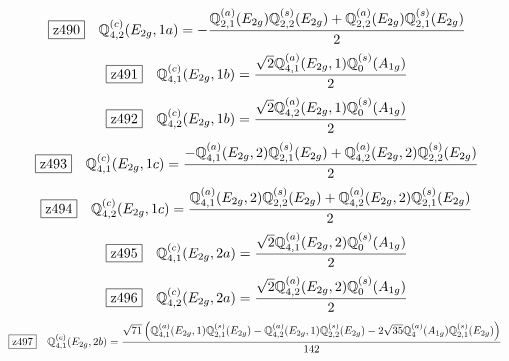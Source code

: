 \documentclass[fleqn,10pt,landscape]{jsarticle}
\begin{document}
\begin{dmath*}
\hspace*{3mm}\fbox{z490}\quad \mathbb{Q}_{4,2}^{(c)}(E_{2g},1a)=- \frac{\mathbb{Q}_{2,1}^{(a)}(E_{2g}) \mathbb{Q}_{2,2}^{(s)}(E_{2g}) + \mathbb{Q}_{2,2}^{(a)}(E_{2g}) \mathbb{Q}_{2,1}^{(s)}(E_{2g})}{2}
\end{dmath*}
\begin{dmath*}
\hspace*{3mm}\fbox{z491}\quad \mathbb{Q}_{4,1}^{(c)}(E_{2g},1b)=\frac{\sqrt{2} \mathbb{Q}_{4,1}^{(a)}(E_{2g},1) \mathbb{Q}_{0}^{(s)}(A_{1g})}{2}
\end{dmath*}
\begin{dmath*}
\hspace*{3mm}\fbox{z492}\quad \mathbb{Q}_{4,2}^{(c)}(E_{2g},1b)=\frac{\sqrt{2} \mathbb{Q}_{4,2}^{(a)}(E_{2g},1) \mathbb{Q}_{0}^{(s)}(A_{1g})}{2}
\end{dmath*}
\begin{dmath*}
\hspace*{3mm}\fbox{z493}\quad \mathbb{Q}_{4,1}^{(c)}(E_{2g},1c)=\frac{- \mathbb{Q}_{4,1}^{(a)}(E_{2g},2) \mathbb{Q}_{2,1}^{(s)}(E_{2g}) + \mathbb{Q}_{4,2}^{(a)}(E_{2g},2) \mathbb{Q}_{2,2}^{(s)}(E_{2g})}{2}
\end{dmath*}
\begin{dmath*}
\hspace*{3mm}\fbox{z494}\quad \mathbb{Q}_{4,2}^{(c)}(E_{2g},1c)=\frac{\mathbb{Q}_{4,1}^{(a)}(E_{2g},2) \mathbb{Q}_{2,2}^{(s)}(E_{2g}) + \mathbb{Q}_{4,2}^{(a)}(E_{2g},2) \mathbb{Q}_{2,1}^{(s)}(E_{2g})}{2}
\end{dmath*}
\begin{dmath*}
\hspace*{3mm}\fbox{z495}\quad \mathbb{Q}_{4,1}^{(c)}(E_{2g},2a)=\frac{\sqrt{2} \mathbb{Q}_{4,1}^{(a)}(E_{2g},2) \mathbb{Q}_{0}^{(s)}(A_{1g})}{2}
\end{dmath*}
\begin{dmath*}
\hspace*{3mm}\fbox{z496}\quad \mathbb{Q}_{4,2}^{(c)}(E_{2g},2a)=\frac{\sqrt{2} \mathbb{Q}_{4,2}^{(a)}(E_{2g},2) \mathbb{Q}_{0}^{(s)}(A_{1g})}{2}
\end{dmath*}
\begin{dmath*}
\hspace*{3mm}\fbox{z497}\quad \mathbb{Q}_{4,1}^{(c)}(E_{2g},2b)=\frac{\sqrt{71} \left(\mathbb{Q}_{4,1}^{(a)}(E_{2g},1) \mathbb{Q}_{2,1}^{(s)}(E_{2g}) - \mathbb{Q}_{4,2}^{(a)}(E_{2g},1) \mathbb{Q}_{2,2}^{(s)}(E_{2g}) - 2 \sqrt{35} \mathbb{Q}_{4}^{(a)}(A_{1g}) \mathbb{Q}_{2,1}^{(s)}(E_{2g})\right)}{142}
\end{dmath*}
\end{document}
